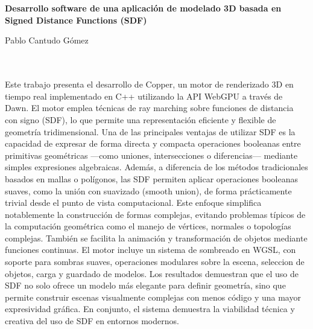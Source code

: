 \chapter*{}


\cleardoublepage
\thispagestyle{empty}

\begin{center}
{\large\bfseries Desarrollo software de una aplicación de modelado 3D
basada en Signed Distance Functions (SDF)}\\
\end{center}
\begin{center}
Pablo Cantudo Gómez\\
\end{center}

\\

\vspace{0.7cm}
\\

Este trabajo presenta el desarrollo de Copper, un motor de renderizado 3D en
tiempo real implementado en C++ utilizando la API WebGPU a través de
Dawn. El motor emplea técnicas de ray marching sobre funciones de distancia
con signo (SDF), lo que permite una representación eficiente y flexible de
geometría tridimensional. Una de las principales ventajas de utilizar SDF es
la capacidad de expresar de forma directa y compacta operaciones booleanas
entre primitivas geométricas —como uniones, intersecciones o diferencias—
mediante simples expresiones algebraicas. Además, a diferencia de los métodos
tradicionales basados en mallas o polígonos, las SDF permiten aplicar
operaciones booleanas suaves, como la unión con suavizado (smooth union),
de forma prácticamente trivial desde el punto de vista computacional.
\bigbreak
Este enfoque simplifica notablemente la construcción de formas complejas,
 evitando problemas típicos de la computación geométrica como el
manejo de vértices, normales o topologías complejas. También se facilita
la animación y transformación de objetos mediante funciones continuas. El
motor incluye un sistema de sombreado en WGSL, con soporte para sombras
suaves, operaciones modulares sobre la escena, seleccion de objetos, carga
y guardado de modelos. Los resultados demuestran que el uso de SDF no
solo ofrece un modelo más elegante para definir geometría, sino que permite
construir escenas visualmente complejas con menos código y una mayor expresividad gráfica.
En conjunto, el sistema demuestra la viabilidad técnica
y creativa del uso de SDF en entornos modernos.
\cleardoublepage


